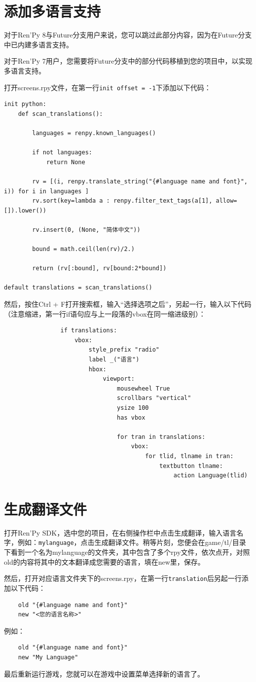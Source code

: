 \documentclass[../../Main.tex]{subfiles}
\begin{document}
\section{添加多语言支持}
对于Ren'Py 8与Future分支用户来说，您可以跳过此部分内容，因为在Future分支中已内建多语言支持。

对于Ren'Py 7用户，您需要将Future分支中的部分代码移植到您的项目中，以实现多语言支持。

打开screens.rpy文件，在第一行\verb|init offset = -1|下添加以下代码：
\begin{lstlisting}
init python:
    def scan_translations():

        languages = renpy.known_languages()

        if not languages:
            return None

        rv = [(i, renpy.translate_string("{#language name and font}", i)) for i in languages ]
        rv.sort(key=lambda a : renpy.filter_text_tags(a[1], allow=[]).lower())

        rv.insert(0, (None, "简体中文"))

        bound = math.ceil(len(rv)/2.)

        return (rv[:bound], rv[bound:2*bound])

default translations = scan_translations()
\end{lstlisting}

然后，按住Ctrl + F打开搜索框，输入“选择选项之后”，另起一行，输入以下代码（注意缩进，第一行if语句应与上一段落的vbox在同一缩进级别）：
\begin{lstlisting}
                if translations:
                    vbox:
                        style_prefix "radio"
                        label _("语言")
                        hbox:
                            viewport:
                                mousewheel True
                                scrollbars "vertical"
                                ysize 100
                                has vbox

                                for tran in translations:
                                    vbox:
                                        for tlid, tlname in tran:
                                            textbutton tlname:
                                                action Language(tlid)
\end{lstlisting}

\section{生成翻译文件}
打开Ren'Py SDK，选中您的项目，在右侧操作栏中点击生成翻译，输入语言名字，例如：\verb|mylanguage|，点击生成翻译文件。稍等片刻，您便会在game/tl/目录下看到一个名为mylanguage的文件夹，其中包含了多个rpy文件，依次点开，对照old的内容将其中的文本翻译成您需要的语言，填在new里，保存。

然后，打开对应语言文件夹下的screens.rpy，在第一行\verb|translation|后另起一行添加以下代码：

\begin{lstlisting}
    old "{#language name and font}"
    new "<您的语言名称>"
\end{lstlisting}

例如：

\begin{lstlisting}
    old "{#language name and font}"
    new "My Language"
\end{lstlisting}

最后重新运行游戏，您就可以在游戏中设置菜单选择新的语言了。
\end{document}
